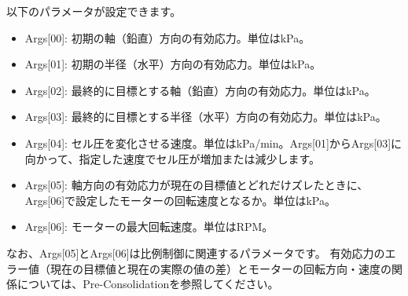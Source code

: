 以下のパラメータが設定できます。
\begin{itemize}
    \item Args[00]: 初期の軸（鉛直）方向の有効応力。単位はkPa。
    \item Args[01]: 初期の半径（水平）方向の有効応力。単位はkPa。
    \item Args[02]: 最終的に目標とする軸（鉛直）方向の有効応力。単位はkPa。
    \item Args[03]: 最終的に目標とする半径（水平）方向の有効応力。単位はkPa。
    \item Args[04]: セル圧を変化させる速度。単位はkPa/min。Args[01]からArgs[03]に向かって、指定した速度でセル圧が増加または減少します。
    \item Args[05]: 軸方向の有効応力が現在の目標値とどれだけズレたときに、Args[06]で設定したモーターの回転速度となるか。単位はkPa。
    \item Args[06]: モーターの最大回転速度。単位はRPM。
\end{itemize}
なお、Args[05]とArgs[06]は比例制御に関連するパラメータです。
有効応力のエラー値（現在の目標値と現在の実際の値の差）とモーターの回転方向・速度の関係については、Pre-Consolidationを参照してください。